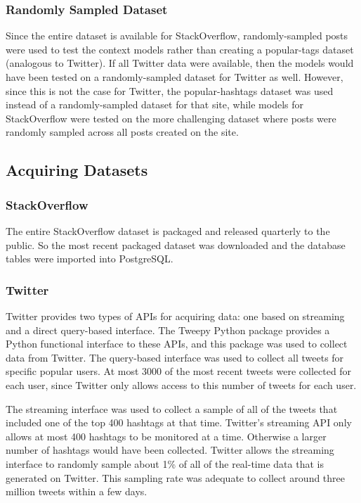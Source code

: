 \documentclass[man,floatsintext,donotrepeattitle]{apa6}
\begin{document}
\subsubsection{Randomly Sampled Dataset}

Since the entire dataset is available for StackOverflow, randomly-sampled posts were used to test the context models rather than creating a popular-tags dataset (analogous to Twitter).
If all Twitter data were available, then the models would have been tested on a randomly-sampled dataset for Twitter as well.
However, since this is not the case for Twitter, the popular-hashtags dataset was used instead of a randomly-sampled dataset for that site,
while models for StackOverflow were tested on the more challenging dataset where posts were randomly sampled across all posts created on the site.

\subsection{Acquiring Datasets}

\subsubsection{StackOverflow}

The entire StackOverflow dataset is packaged and released quarterly to the public.
So the most recent packaged dataset was downloaded and the database tables were imported into PostgreSQL.

\subsubsection{Twitter}

Twitter provides two types of APIs for acquiring data: one based on streaming and a direct query-based interface.
The Tweepy Python package provides a Python functional interface to these APIs, and this package was used to collect data from Twitter.
The query-based interface was used to collect all tweets for specific popular users.
At most \num{3000} of the most recent tweets were collected for each user, since Twitter only allows access to this number of tweets for each user.

The streaming interface was used to collect a sample of all of the tweets that included one of the top 400 hashtags at that time.
Twitter's streaming API only allows at most 400 hashtags to be monitored at a time.
Otherwise a larger number of hashtags would have been collected.
Twitter allows the streaming interface to randomly sample about 1\% of all of the real-time data that is generated on Twitter.
This sampling rate was adequate to collect around three million tweets within a few days.
\end{document}
